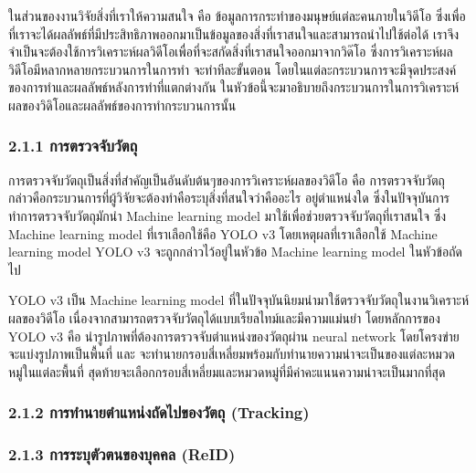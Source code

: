 ในส่วนของงานวิจัยสิ่งที่เราให้ความสนใจ คือ ข้อมูลการกระทำของมนุษย์แต่ละคนภายในวิดีโอ  ซึ่งเพื่อที่เราจะได้ผลลัพธ์ที่มีประสิทธิภาพออกมาเป็นข้อมูลของสิ่งที่เราสนใจและสามารถนำไปใช้ต่อได้ เราจึงจำเป็นจะต้องใช้การวิเคราะห์ผลวิดีโอเพื่อที่จะสกัดสิ่งที่เราสนใจออกมาจากวิด๊โอ ซึ่งการวิเคราะห์ผลวิดีโอมีหลากหลายกระบวนการในการทำ จะทำทีละขั้นตอน โดยในแต่ละกระบวนการจะมีจุดประสงค์ของการทำและผลลัพธ์หลังการทำที่แตกต่างกัน ในหัวข้อนี้จะมาอธิบายถึงกระบวนการในการวิเคราะห์ผลของวิดิโอและผลลัพธ์ของการทำกระบวนการนั้น

\subsubsection*{2.1.1 การตรวจจับวัตถุ}
การตรวจจับวัตถุเป็นสิ่งที่สำคัญเป็นอันดับต้นๆของการวิเคราะห์ผลของวิดีโอ คือ การตรวจจับวัตถุ กล่าวคือกระบวนการที่ผู้วิจัยจะต้องทำคือระบุสิ่งที่สนใจว่าคืออะไร อยู่ตำแหน่งใด ซึ่งในปัจจุบันการทำการตรวจจับวัตถุมักนำ Machine learning model มาใช้เพื่อช่วยตรวจจับวัตถุที่เราสนใจ ซึ่ง Machine learning model ที่เราเลือกใช้คือ YOLO v3 โดยเหตุผลที่เราเลือกใช้ Machine learning model YOLO v3 จะถูกกล่าวไว้อยู่ในหัวข้อ Machine learning model ในหัวข้อถัดไป
\par
YOLO v3 เป็น Machine learning model ที่ในปัจจุบันนิยมนำมาใช้ตรวจจับวัตถุในงานวิเคราะห์ผลของวิดีโอ เนื่องจากสามารถตรวจจับวัตถุได้แบบเรียลไทม์และมีความแม่นยำ โดยหลักการของ YOLO v3 คือ นำรูปภาพที่ต้องการตรวจจับตำแหน่งของวัตถุผ่าน neural network โดยโครงข่ายจะแบ่งรูปภาพเป็นพื้นที่ และ จะทำนายกรอบสี่เหลี่ยมพร้อมกับทำนายความน่าจะเป็นของแต่ละหมวดหมู่ในแต่ละพื้นที่ สุดท้ายจะเลือกกรอบสี่เหลี่ยมและหมวดหมู่ที่มีค่าคะแนนความน่าจะเป็นมากที่สุด

\subsubsection*{2.1.2 การทำนายตำแหน่งถัดไปของวัตถุ (Tracking)}


\subsubsection*{2.1.3 การระบุตัวตนของบุคคล (ReID)}


